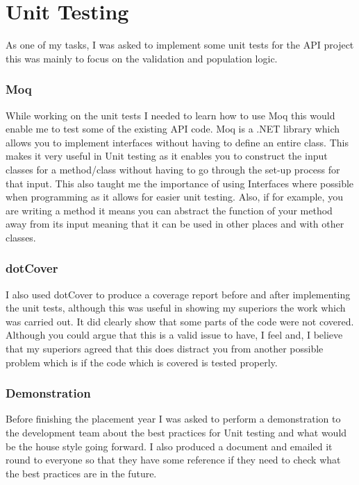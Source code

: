 \section{Unit Testing}{
	As one of my tasks, I was asked to implement some unit tests for the API project this was mainly to focus on the validation and population logic. 
	\subsubsection*{Moq}{
		While working on the unit tests I needed to learn how to use Moq this would enable me to test some of the existing API code. Moq is a .NET library which allows you to implement interfaces without having to define an entire class. This makes it very useful in Unit testing as it enables you to construct the input classes for a method/class without having to go through the set-up process for that input. This also taught me the importance of using Interfaces where possible when programming as it allows for easier unit testing. Also, if for example, you are writing a method it means you can abstract the function of your method away from its input meaning that it can be used in other places and with other classes.
	}
	\subsubsection*{dotCover}{
	I also used dotCover\cite{dotCover2018} to produce a coverage report before and after implementing the unit tests, although this was useful in showing my superiors the work which was carried out. It did clearly show that some parts of the code were not covered. Although you could argue that this is a valid issue to have, I feel and, I believe that my superiors agreed that this does distract you from another possible problem which is if the code which is covered is tested properly.
	} 
	\subsubsection*{Demonstration}{
		Before finishing the placement year I was asked to perform a demonstration to the development team about the best practices for Unit testing and what would be the house style going forward. I also produced a document and emailed it round to everyone so that they have some reference if they need to check what the best practices are in the future.
	}
}